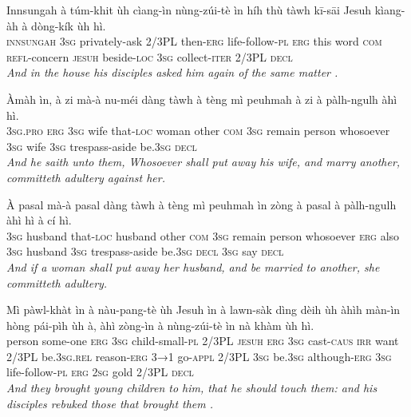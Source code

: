 \documentclass[11pt,a4paper]{article}
\begin{document}
\begin{exe}
\gll Innsungah à túm-khit ùh cìang-ìn nùng-zúi-tè ìn híh thù tàwh kī-sāi Jesuh kìang-àh à dòng-kík ùh hì. \\
     \textsc{innsungah} \textsc{3sg} privately-ask 2/3PL then-\textsc{erg} life-follow-\textsc{pl} \textsc{erg} this word \textsc{com} \textsc{refl}-concern \textsc{jesuh} beside-\textsc{loc} \textsc{3sg} collect-\textsc{iter} 2/3PL \textsc{decl} \\
\glt \textcolor{kjvcolor}{\textit{And in the house his disciples asked him again of the same matter .}}

\gll Àmàh ìn, à zi mà-à nu-méi dàng tàwh à tèng mì peuhmah à zi à pàlh-ngulh àhì hì. \\
     \textsc{3sg}.\textsc{pro} \textsc{erg} \textsc{3sg} wife that-\textsc{loc} woman other \textsc{com} \textsc{3sg} remain person whosoever \textsc{3sg} wife \textsc{3sg} trespass-aside be.\textsc{3sg} \textsc{decl} \\
\glt \textcolor{kjvcolor}{\textit{And he saith unto them, Whosoever shall put away his wife, and marry another, committeth adultery against her.}}

\gll À pasal mà-à pasal dàng tàwh à tèng mì peuhmah ìn zòng à pasal à pàlh-ngulh àhì hì à cí hì. \\
     \textsc{3sg} husband that-\textsc{loc} husband other \textsc{com} \textsc{3sg} remain person whosoever \textsc{erg} also \textsc{3sg} husband \textsc{3sg} trespass-aside be.\textsc{3sg} \textsc{decl} \textsc{3sg} say \textsc{decl} \\
\glt \textcolor{kjvcolor}{\textit{And if a woman shall put away her husband, and be married to another, she committeth adultery.}}

\gll Mì pàwl-khàt ìn à nàu-pang-tè ùh Jesuh ìn à lawn-sàk dìng dèih ùh àhìh màn-ìn hòng pái-pìh ùh à, àhì zòng-ìn à nùng-zúi-tè ìn nà khàm ùh hì. \\
     person some-one \textsc{erg} \textsc{3sg} child-small-\textsc{pl} 2/3PL \textsc{jesuh} \textsc{erg} \textsc{3sg} cast-\textsc{caus} \textsc{irr} want 2/3PL be.\textsc{3sg}.\textsc{rel} reason-\textsc{erg} \textsc{3→1} go-\textsc{appl} 2/3PL \textsc{3sg} be.\textsc{3sg} although-\textsc{erg} \textsc{3sg} life-follow-\textsc{pl} \textsc{erg} \textsc{2sg} gold 2/3PL \textsc{decl} \\
\glt \textcolor{kjvcolor}{\textit{And they brought young children to him, that he should touch them: and his disciples rebuked those that brought them .}}


\end{exe}
\end{document}
